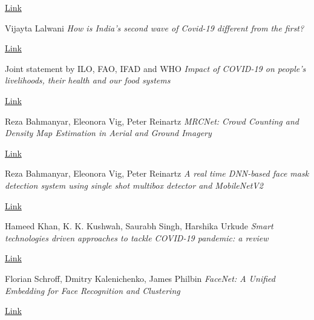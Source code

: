 \documentclass[eng]{FCEFyN-class}
\begin{document}
\begin{thebibliography}{9}
\href{https://indianexpress.com/article/explained/explained-whats-changed-in-second-wave-7289002/}{Link}

Vijayta Lalwani
\textit{How is India’s second wave of Covid-19 different from the first?}

\href{https://scroll.in/article/992165/are-younger-people-at-greater-risk-in-indias-second-wave-of-covid-19}{Link}

Joint statement by ILO, FAO, IFAD and WHO
\textit{Impact of COVID-19 on people's livelihoods, their health and our food systems}

\href{https://www.who.int/news/item/13-10-2020-impact-of-covid-19-on-people's-livelihoods-their-health-and-our-food-systems}{Link}

Reza Bahmanyar, Eleonora Vig, Peter Reinartz
\textit{MRCNet: Crowd Counting and Density Map Estimation in Aerial and Ground Imagery}

\href{https://arxiv.org/pdf/1909.12743.pdf}{Link}

Reza Bahmanyar, Eleonora Vig, Peter Reinartz
\textit{A real time DNN-based face mask detection system using single shot multibox detector and MobileNetV2}

\href{https://www.ncbi.nlm.nih.gov/pmc/articles/PMC7775036/}{Link}

Hameed Khan, K. K. Kushwah, Saurabh Singh, Harshika Urkude
\textit{Smart technologies driven approaches to tackle COVID-19 pandemic: a review}

\href{https://www.ncbi.nlm.nih.gov/pmc/articles/PMC7799428/}{Link}

Florian Schroff, Dmitry Kalenichenko, James Philbin
\textit{FaceNet: A Unified Embedding for Face Recognition and Clustering}

\href{https://arxiv.org/abs/1503.03832/}{Link}


\end{thebibliography}
\end{document}
